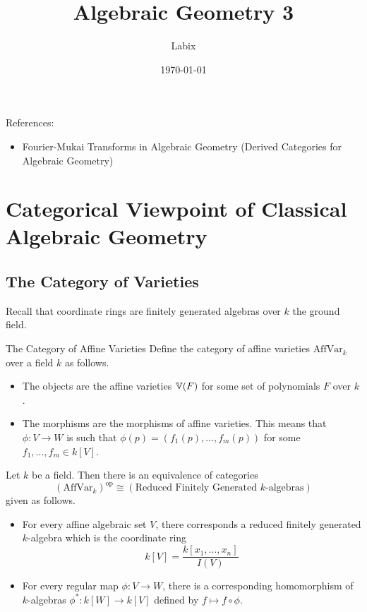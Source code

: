 \documentclass[a4paper]{article}
\title{Algebraic Geometry 3}
\author{Labix}
\date{\today}
\begin{document}
\maketitle
\begin{abstract}
\end{abstract}

References: 
\begin{itemize}
\item Fourier-Mukai Transforms in Algebraic Geometry (Derived Categories for Algebraic Geometry)
\end{itemize}
\pagebreak
\tableofcontents
\pagebreak
\section{Categorical Viewpoint of Classical Algebraic Geometry}
\subsection{The Category of Varieties}
Recall that coordinate rings are finitely generated algebras over $k$ the ground field. 

\begin{defn}{The Category of Affine Varieties}{} Define the category of affine varieties $\text{AffVar}_k$ over a field $k$ as follows. 
\begin{itemize}
\item The objects are the affine varieties $\mathbb{V}(F)$ for some set of polynomials $F$ over $k$. 
\item The morphisms are the morphisms of affine varieties. This means that $\phi:V\to W$ is such that $\phi(p)=(f_1(p),\dots,f_m(p))$ for some $f_1,\dots,f_m\in k[V]$. 
\end{itemize}
\end{defn}

\begin{prp}{}{} Let $k$ be a field. Then there is an equivalence of categories $$(\text{AffVar}_k)^\text{op}\cong(\text{Reduced Finitely Generated }k\text{-algebras})$$
given as follows. 
\begin{itemize}
\item For every affine algebraic set $V$, there corresponds a reduced finitely generated $k$-algebra which is the coordinate ring $$k[V]=\frac{k[x_1,\dots,x_n]}{I(V)}$$
\item For every regular map $\phi:V\to W$, there is a corresponding homomorphism of $k$-algebras $\phi^\ast:k[W]\to k[V]$ defined by $f\mapsto f\circ\phi$. 
\end{itemize}
\end{prp}
\end{document}
